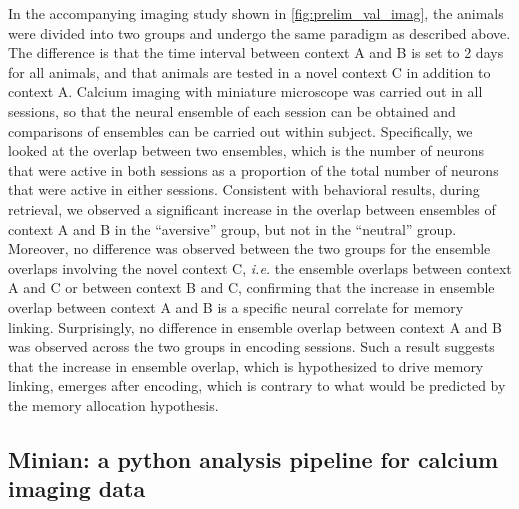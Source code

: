\documentclass[master.tex]{subfiles}
\begin{document}

In the accompanying imaging study shown in \autoref{fig:prelim_val_imag}, the
animals were divided into two groups and undergo the same paradigm as described
above. The difference is that the time interval between context A and B is set
to 2 days for all animals, and that animals are tested in a novel context C in
addition to context A. Calcium imaging with miniature microscope was carried out in all
sessions, so that the neural ensemble of each session can be obtained and comparisons
of ensembles can be carried out within subject. Specifically, we looked at the
overlap between two ensembles, which is the number of neurons that were active
in both sessions as a proportion of the total number of neurons that were active in
either sessions. Consistent with behavioral results, during retrieval, we observed
a significant increase in the overlap between ensembles of context A and B in
the ``aversive'' group, but not in the ``neutral'' group. Moreover, no
difference was observed between the two groups for the ensemble overlaps
involving the novel context C, \textit{i.e.} the ensemble overlaps between
context A and C or between context B and C, confirming that the increase in
ensemble overlap between context A and B is a specific neural correlate for
memory linking. Surprisingly, no difference in ensemble overlap between context
A and B was observed across the two groups in encoding sessions. Such a result
suggests that the increase in ensemble overlap, which is hypothesized to drive
memory linking, emerges after encoding, which is contrary to what would be
predicted by the memory allocation hypothesis.

\subsection*{Minian: a python analysis pipeline for calcium imaging data}
\end{document}
